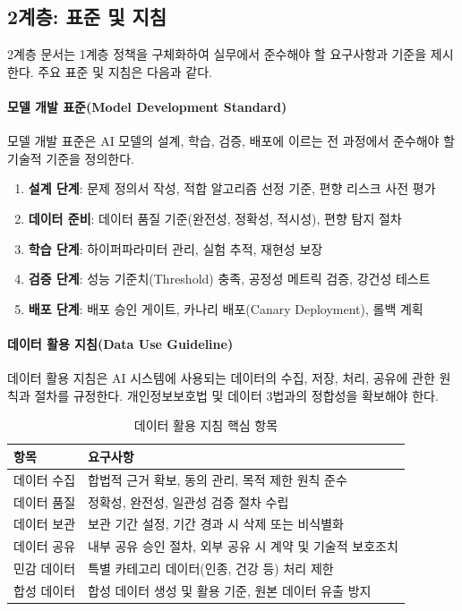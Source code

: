 \subsection{2계층: 표준 및 지침}
\label{sec:5.1.3}

2계층 문서는 1계층 정책을 구체화하여 실무에서 준수해야 할 요구사항과 기준을 제시한다. 주요 표준 및 지침은 다음과 같다.

\paragraph{모델 개발 표준(Model Development Standard)}
모델 개발 표준은 AI 모델의 설계, 학습, 검증, 배포에 이르는 전 과정에서 준수해야 할 기술적 기준을 정의한다.

\begin{enumerate}
 \item \textbf{설계 단계}: 문제 정의서 작성, 적합 알고리즘 선정 기준, 편향 리스크 사전 평가
 \item \textbf{데이터 준비}: 데이터 품질 기준(완전성, 정확성, 적시성), 편향 탐지 절차
 \item \textbf{학습 단계}: 하이퍼파라미터 관리, 실험 추적, 재현성 보장
 \item \textbf{검증 단계}: 성능 기준치(Threshold) 충족, 공정성 메트릭 검증, 강건성 테스트
 \item \textbf{배포 단계}: 배포 승인 게이트, 카나리 배포(Canary Deployment), 롤백 계획
\end{enumerate}

\paragraph{데이터 활용 지침(Data Use Guideline)}
데이터 활용 지침은 AI 시스템에 사용되는 데이터의 수집, 저장, 처리, 공유에 관한 원칙과 절차를 규정한다. 개인정보보호법 및 데이터 3법과의 정합성을 확보해야 한다.

\begin{table}[htbp]
\centering
\caption{데이터 활용 지침 핵심 항목}
\label{tab:data_guideline}
\begin{tabularx}{\textwidth}{p{2.5cm}X}
\toprule
\textbf{항목} & \textbf{요구사항} \\
\midrule
데이터 수집 & 합법적 근거 확보, 동의 관리, 목적 제한 원칙 준수 \\
데이터 품질 & 정확성, 완전성, 일관성 검증 절차 수립 \\
데이터 보관 & 보관 기간 설정, 기간 경과 시 삭제 또는 비식별화 \\
데이터 공유 & 내부 공유 승인 절차, 외부 공유 시 계약 및 기술적 보호조치 \\
민감 데이터 & 특별 카테고리 데이터(인종, 건강 등) 처리 제한 \\
합성 데이터 & 합성 데이터 생성 및 활용 기준, 원본 데이터 유출 방지 \\
\bottomrule
\end{tabularx}
\end{table}

